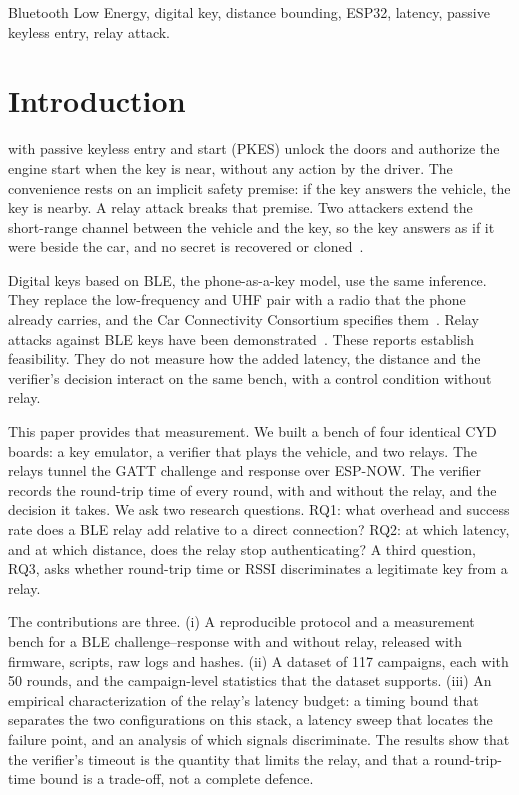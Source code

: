 \documentclass{ieeeaccess}
\begin{document}
\begin{keywords}
Bluetooth Low Energy, digital key, distance bounding, ESP32, latency, passive keyless entry, relay attack.
\end{keywords}

\titlepgskip=-15pt

\maketitle

\section{Introduction}
\label{sec:introduction}

 with passive keyless entry and start (PKES) unlock the doors and authorize the engine start when the key is near, without any action by the driver. The convenience rests on an implicit safety premise: if the key answers the vehicle, the key is nearby. A relay attack breaks that premise. Two attackers extend the short-range channel between the vehicle and the key, so the key answers as if it were beside the car, and no secret is recovered or cloned~\cite{b1}.

Digital keys based on BLE, the phone-as-a-key model, use the same inference. They replace the low-frequency and UHF pair with a radio that the phone already carries, and the Car Connectivity Consortium specifies them~\cite{b9}. Relay attacks against BLE keys have been demonstrated~\cite{b3,b4}. These reports establish feasibility. They do not measure how the added latency, the distance and the verifier's decision interact on the same bench, with a control condition without relay.

This paper provides that measurement. We built a bench of four identical CYD boards: a key emulator, a verifier that plays the vehicle, and two relays. The relays tunnel the GATT challenge and response over ESP-NOW. The verifier records the round-trip time of every round, with and without the relay, and the decision it takes. We ask two research questions. RQ1: what overhead and success rate does a BLE relay add relative to a direct connection? RQ2: at which latency, and at which distance, does the relay stop authenticating? A third question, RQ3, asks whether round-trip time or RSSI discriminates a legitimate key from a relay.

The contributions are three. (i) A reproducible protocol and a measurement bench for a BLE challenge--response with and without relay, released with firmware, scripts, raw logs and hashes. (ii) A dataset of 117 campaigns, each with 50 rounds, and the campaign-level statistics that the dataset supports. (iii) An empirical characterization of the relay's latency budget: a timing bound that separates the two configurations on this stack, a latency sweep that locates the failure point, and an analysis of which signals discriminate. The results show that the verifier's timeout is the quantity that limits the relay, and that a round-trip-time bound is a trade-off, not a complete defence.
\end{document}
